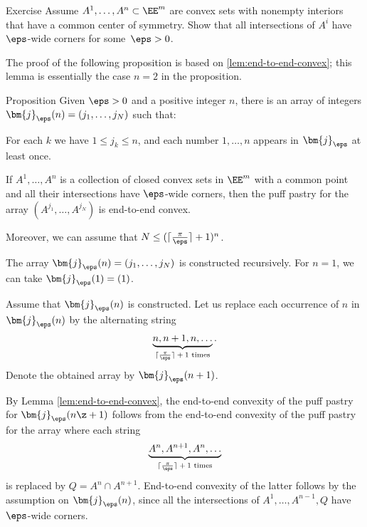 \begin{thm}{Exercise}\label{ex:centrally-simmetric-walls}
Assume $A^1,\dots,A^n\subset\EE^m$ are
convex sets with nonempty interiors that have a common center of symmetry.
Show that all intersections of $A^i$ have $\eps$-wide corners for some~$\eps>0$.
\end{thm}

The proof of the following proposition is based on \ref{lem:end-to-end-convex};
this lemma is essentially the case $n=2$ in the proposition.

\begin{thm}{Proposition}\label{prop:end-to-end-convex}
Given $\eps>0$ and a positive integer $n$, 
there is an array of integers $\bm{j}_\eps(n)=(j_1,\dots,j_N)$ 
such that: 

\begin{subthm}{} For each $k$ we have $1\le j_k\le n$,
and each number $1,\dots,n$ appears in $\bm{j}_\eps$ at least once.
\end{subthm}

\begin{subthm}{}
If $A^1,\dots,A^n$ is a collection of closed convex sets in $\EE^m$ with a common point 
and all their intersections have $\eps$-wide corners,  
then the puff pastry for the array
$(A^{j_1},\dots,A^{j_N})$ is end-to-end convex.
\end{subthm}

Moreover, we can assume that $N\le (\lceil\tfrac\pi\eps\rceil+1)^n$.
\end{thm}

The array $\bm{j}_\eps(n)=(j_1,\dots,j_N)$  is constructed recursively.
For $n=1$, we can take $\bm{j}_\eps(1)=(1)$.

Assume that $\bm{j}_\eps(n)$ is constructed.
Let us replace each occurrence of $n$ in $\bm{j}_\eps(n)$ by the alternating string 
\[\underbrace{n,n+1,n,\dots}_{\text{$\lceil\tfrac\pi\eps\rceil+1$ times}}.\]
Denote the obtained array by $\bm{j}_\eps(n+1)$.

By Lemma \ref{lem:end-to-end-convex},
the end-to-end convexity of the puff pastry for $\bm{j}_\eps(n\z+1)$
follows from the end-to-end convexity of the puff pastry for the array
where each string
\[\underbrace{A^n,A^{n+1},A^n,\dots}_{\text{$\lceil\tfrac\pi\eps\rceil+1$ times}}\]
is replaced by  $Q=A^n\cap A^{n+1}$.
End-to-end convexity of the latter follows by the assumption on $\bm{j}_\eps(n)$, 
since all the intersections of $A^1,\dots,A^{n-1},Q$
have $\eps$-wide corners.

